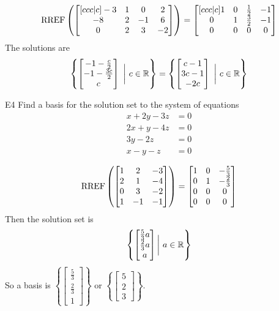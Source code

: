 \documentclass{sbgLAexam}
\begin{document}
\begin{solution}
$$\operatorname{RREF}\left(\begin{bmatrix}[ccc|c] -3 & 1 & 0 & 2 \\ -8 & 2 & -1 & 6 \\ 0 & 2 & 3 & -2 \end{bmatrix} \right) = \begin{bmatrix}[ccc|c] 1 & 0 & \frac{1}{2} & -1 \\ 0 & 1 & \frac{3}{2} & -1 \\ 0 & 0 & 0 & 0 \end{bmatrix}$$
The solutions are $$\left\{ \begin{bmatrix} -1-\frac{c}{2} \\ -1-\frac{3c}{2} \\ c \end{bmatrix}\ \bigg|\ c\in \mathbb{R}\right\} = \left\{ \begin{bmatrix} c-1 \\ 3c-1 \\ -2c  \end{bmatrix}\ \bigg|\ c\in \mathbb{R}\right\}$$
\end{solution}

\begin{problem}{E4}
Find a basis for the solution set to the system of equations
\begin{align*}
x+2y-3z &= 0 \\
2x+y-4z &= 0 \\
3y -2z & = 0 \\
x -y -z &= 0
\end{align*}
\end{problem}
\begin{solution}
$$\operatorname{RREF} \left(\begin{bmatrix} 1 & 2 & -3 \\ 2 & 1 & -4 \\ 0 & 3 & -2 \\ 1 & -1 & -1 \end{bmatrix} \right) = \begin{bmatrix} 1 & 0 & -\frac{5}{3} \\ 0 & 1 & -\frac{2}{3} \\ 0 & 0 & 0 \\ 0 & 0 & 0 \end{bmatrix}$$
Then the solution set is
$$\left\{ \begin{bmatrix} \frac{5}{3}a \\ \frac{2}{3}a \\ a \end{bmatrix} \bigg|\ a \in \mathbb{R} \right\}$$
So a basis is $\left\{ \begin{bmatrix} \frac{5}{3} \\ \frac{2}{3} \\ 1 \end{bmatrix} \right\}$ or $\left\{ \begin{bmatrix} 5 \\  2 \\ 3 \end{bmatrix} \right\}$.
\end{solution}
\end{document}
